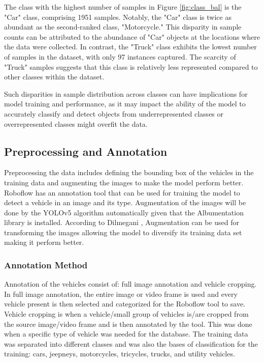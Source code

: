 The class with the highest number of samples in Figure \ref{fig:class_bal} is the "Car" class, comprising 1951 samples. Notably, the "Car" class is twice as abundant as the second-ranked class, "Motorcycle." This disparity in sample counts can be attributed to the abundance of "Car" objects at the locations where the data were collected.
In contrast, the "Truck" class exhibits the lowest number of samples in the dataset, with only 97 instances captured. The scarcity of "Truck" samples suggests that this class is relatively less represented compared to other classes within the dataset.

Such disparities in sample distribution across classes can have implications for model training and performance, as it may impact the ability of the model to accurately classify and detect objects from underrepresented classes or overrepresented classes might overfit the data.



\subsection {Preprocessing and Annotation}

	Preprocessing the data includes defining the bounding box of the vehicles in the training data and augmenting the images to make the model perform better. Roboflow has an annotation tool that can be used for  training the model to detect a vehicle in an image and its type. Augmentation of the images will be done by the YOLOv5 algorithm automatically given that the Albumentation library is installed. According to Dilmegani \citeyear{dilmegani}, Augmentation can be used for transforming the images allowing the model to diversify its training data set making it perform better.
	

	
\subsubsection{Annotation Method}
Annotation of the vehicles consist of: full image annotation and vehicle cropping. In full image annotation, the entire image or video frame is used and every vehicle present is then selected and categorized for the Roboflow tool to save. Vehicle cropping is when a vehicle/small group of vehicles is/are cropped from the source image/video frame and is then annotated by the tool. This was done when a specific type of vehicle was needed for the database. The training data was separated into different classes and was also the bases of classification for the training: cars, jeepneys, motorcycles, tricycles, trucks, and utility vehicles. 

